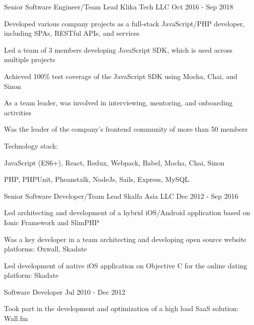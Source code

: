\begin{cventries}
  \cventry
    {Senior Software Engineer/Team Lead} %
    {Klika Tech LLC} %
    {} %
    {Oct 2016 - Sep 2018} %
    {
      \begin{cvitems}
        \item Developed various company projects as a full-stack JavaScript/PHP developer, including SPAs, RESTful APIs, and services
        \item Led a team of 3 members developing JavaScript SDK, which is used across multiple projects
        \item Achieved 100\% test coverage of the JavaScript SDK using Mocha, Chai, and Sinon
        \item As a team leader, was involved in interviewing, mentoring, and onboarding activities
        \item Was the leader of the company's frontend community of more than 50 members
      \end{cvitems}
      \vspace{5mm}
      Technology stack:
      \begin{cvstackitems}
        \item JavaScript (ES6+), React, Redux, Webpack, Babel, Mocha, Chai, Sinon
        \item PHP, PHPUnit, Pheanstalk, NodeJs, Sails, Express, MySQL
      \end{cvstackitems}
      \vspace{-2.0mm}
    }

  \newpage

  \cventry
    {Senior Software Developer/Team Lead} %
    {Skalfa Asia LLC} %
    {} %
    {Dec 2012 - Sep 2016} %
    {
      \begin{cvitems}
        \item Led architecting and development of a hybrid iOS/Android application based on Ionic Framework and SlimPHP
        \item Was a key developer in a team architecting and developing open source website platforms: Oxwall, Skadate
        \item Led development of native iOS application on Objective C for the online dating platform: Skadate
      \end{cvitems}
    }

  \cventry
    {Software Developer} %
    {} %
    {} %
    {Jul 2010 - Dec 2012} %
    {
      \begin{cvitems}
        \item Took part in the development and optimization of a high load SaaS solution: Wall.fm
      \end{cvitems}
    }


\end{cventries}
